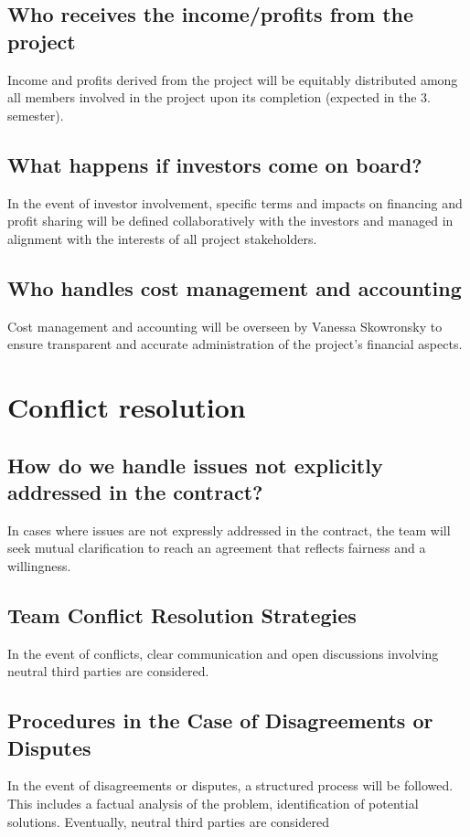\documentclass{article}
\begin{document}
\subsection{Who receives the income/profits from the project}
Income and profits derived from the project will be equitably distributed among all members involved in the project upon its completion (expected in the 3. semester).
\subsection{What happens if investors come on board?}
In the event of investor involvement, specific terms and impacts on financing and profit sharing will be defined collaboratively with the investors and managed in alignment with the interests of all project stakeholders.
\subsection{Who handles cost management and accounting}
Cost management and accounting will be overseen by Vanessa Skowronsky to ensure transparent and accurate administration of the project's financial aspects.

\section{Conflict resolution}
\subsection{How do we handle issues not explicitly addressed in the contract?}
In cases where issues are not expressly addressed in the contract, the team will seek mutual clarification to reach an agreement that reflects fairness and a willingness.

\subsection{Team Conflict Resolution Strategies}
In the event of conflicts, clear communication and open discussions involving neutral third parties are considered.
\subsection{Procedures in the Case of Disagreements or Disputes}
In the event of disagreements or disputes, a structured process will be followed. This includes a factual analysis of the problem, identification of potential solutions. Eventually, neutral third parties are considered
\end{document}
